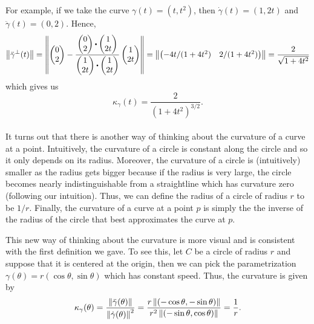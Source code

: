 For example, if we take the curve $\gamma(t) = (t,t^2)$, then $\dot{\gamma}(t) = (1, 2t)$ and $\ddot{\gamma}(t) = (0, 2)$. Hence,
$$\norm{\ddot{\gamma}^{\perp}(t)} = \norm{\begin{pmatrix} 0 \\ 2 \end{pmatrix} - \frac{\begin{pmatrix} 0 \\ 2 \end{pmatrix} \bigcdot \begin{pmatrix} 1 \\ 2t \end{pmatrix}}{\begin{pmatrix} 1 \\ 2t \end{pmatrix} \bigcdot \begin{pmatrix} 1 \\ 2t \end{pmatrix}}\begin{pmatrix} 1 \\ 2t \end{pmatrix}} = \norm{\begin{pmatrix} -4t/(1+4t^2) & 2/(1+4t^2)\end{pmatrix}} = \frac{2}{\sqrt{1 + 4t^2}}$$
which gives us 
$$\kappa_{\gamma}(t) = \frac{2}{(1 + 4t^2)^{3/2}}.$$\\

It turns out that there is another way of thinking about the curvature of a curve at a point. Intuitively, the curvature of a circle is constant along the circle and so it only depends on its radius. Moreover, the curvature of a circle is (intuitively) smaller as the radius gets bigger because if the radius is very large, the circle becomes nearly indistinguishable from a straightline which has curvature zero (following our intuition). Thus, we can define the radius of a circle of radius $r$ to be $1/r$. Finally, the curvature of a curve at a point $p$ is simply the the inverse of the radius of the circle that best approximates the curve at $p$.

This new way of thinking about the curvature is more visual and is consistent with the first definition we gave. To see this, let $C$ be a circle of radius $r$ and suppose that it is centered at the origin, then we can pick the parametrization $\gamma(\theta) = r(\cos \theta, \sin \theta)$ which has constant speed. Thus, the curvature is given by
$$\kappa_{\gamma}(\theta) = \frac{\left\lVert\ddot{\gamma}(\theta) \right\rVert}{\left\lVert\dot{\gamma}(\theta) \right\rVert^2} = \frac{r \left\lVert(-\cos\theta, -\sin \theta) \right\rVert}{r^2 \left\lVert(-\sin\theta, \cos\theta) \right\rVert} = \frac{1}{r}.$$

